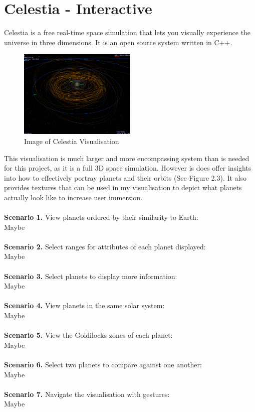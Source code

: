 \section{Celestia - Interactive}
Celestia \cite{celestia} is a free real-time space simulation that lets you
visually experience the universe in three dimensions. It is an open source
system written in C++. 
\begin{figure}[H]
  \centering
      \includegraphics[width=0.5\textwidth]{images/celestia.jpg}
  \caption{Image of Celestia Visualisation}
\end{figure}
This visualisation is much larger and more encompassing system than is needed
for this project, as it is a full 3D space simulation. However is does offer
insights into how to effectively portray planets and their orbits (See Figure
2.3). It also provides textures that can be used in my visualisation to depict
what planets actually look like to increase user immersion.
\\\\
{\bf Scenario 1.} View planets ordered by their similarity to Earth:\\
Maybe
\\\\
{\bf Scenario 2.} Select ranges for attributes of each planet displayed:\\
Maybe
\\\\
{\bf Scenario 3.} Select planets to display more information:\\
Maybe
\\\\
{\bf Scenario 4.} View planets in the same solar system:\\
Maybe
\\\\
{\bf Scenario 5.} View the Goldilocks zones of each planet:\\
Maybe
\\\\
{\bf Scenario 6.} Select two planets to compare against one another:\\
Maybe\\\\
{\bf Scenario 7.} Navigate the visualisation with gestures: \\
Maybe\\\\
